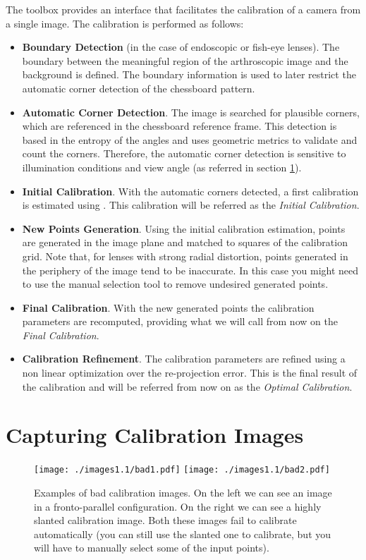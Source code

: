 \documentclass[article,11pt]{memoir}
\begin{document}
The toolbox provides an interface that facilitates the calibration of a camera from a single image. The calibration is performed as follows:
\begin{itemize}
 \item \textbf{Boundary Detection} (in the case of endoscopic or fish-eye lenses). The boundary between the meaningful region of the arthroscopic image and the background is defined. The boundary information is used to later restrict the automatic corner detection of the chessboard pattern.
 \item \textbf{Automatic Corner Detection}. The image is searched for plausible corners, which are referenced in the chessboard reference frame. This detection is based in the entropy of the angles and uses geometric metrics to validate and count the corners. Therefore, the automatic corner detection is sensitive to illumination conditions and view angle (as referred in section \ref{sec:preffered_images}).
 \item \textbf{Initial Calibration}. With the automatic corners detected, a first calibration is estimated using \cite{barreto_09}. This calibration will be referred as the \textit{Initial Calibration}.
 \item \textbf{New Points Generation}. Using the initial calibration estimation, points are generated in the image plane and matched to squares of the calibration grid. Note that, for lenses with strong radial distortion, points generated in the periphery of the image tend to be inaccurate. In this case you might need to use the manual selection tool to remove undesired generated points.
 \item \textbf{Final Calibration}. With the new generated points the calibration parameters are recomputed, providing what we will call from now on the \textit{Final Calibration}.
 \item \textbf{Calibration Refinement}. The calibration parameters are refined using a non linear optimization over the re-projection error. This is the final result of the calibration and will be referred from now on as the \textit{Optimal Calibration}.
\end{itemize}


\section{Capturing Calibration Images}
\label{sec:preffered_images}


\begin{figure}[b]
  \begin{minipage}[2\textwidth]{1\textwidth}
  \centering
  \texttt{[image: ./images1.1/bad1.pdf]}
  \texttt{[image: ./images1.1/bad2.pdf]}
  \end{minipage}
\caption{Examples of bad calibration images. On the left we can see an image in a fronto-parallel configuration. On the right we can see a highly slanted calibration image. Both these images fail to calibrate automatically (you can still use the slanted one to calibrate, but you will have to manually select some of the input points).}
\label{fig:badimages}
\end{figure}
\end{document}
